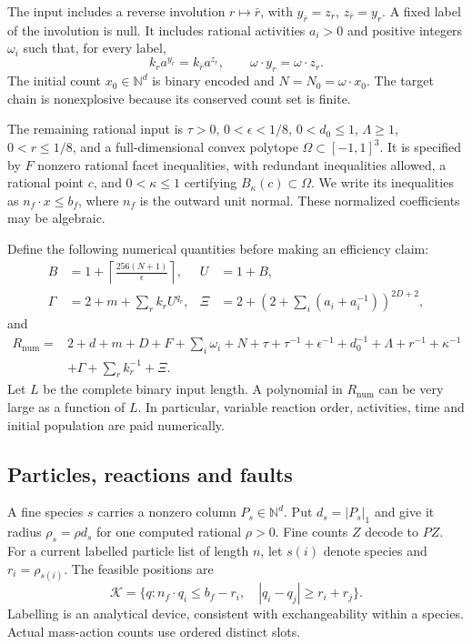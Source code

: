 \documentclass[11pt]{article}
\numberwithin{equation}{section}
\theoremstyle{definition}
\theoremstyle{remark}\newtheorem{remark}[theorem]{Remark}
\newcommand{\N}{\mathbb N}
\newcommand{\K}{\mathcal K}
\newcommand{\Rnum}{R_{\mathrm{num}}}
\begin{document}
The input includes a reverse involution $r\mapsto\bar r$, with
$y_{\bar r}=z_r$, $z_{\bar r}=y_r$. A fixed label of the involution is null.
It includes rational activities $a_i>0$ and positive integers $\omega_i$ such
that, for every label,
\begin{equation}\label{eq:targetbalance}
 k_ra^{y_r}=k_{\bar r}a^{z_r},\qquad
 \omega\cdot y_r=\omega\cdot z_r.
\end{equation}
The initial count $x_0\in\N^d$ is binary encoded and
$N=N_0=\omega\cdot x_0$. The target chain is nonexplosive because its
conserved count set is finite.

The remaining rational input is $\tau>0$, $0<\epsilon<1/8$,
$0<d_0\le1$, $\Lambda\ge1$, $0<r\le1/8$, and a full-dimensional convex
polytope $\Omega\subset[-1,1]^3$. It is specified by $F$ nonzero rational
facet inequalities, with redundant inequalities allowed, a rational point
$c$, and $0<\kappa\le1$ certifying $B_\kappa(c)\subset\Omega$.
We write its inequalities as $n_f\cdot x\le b_f$, where $n_f$ is the
outward unit normal. These normalized coefficients may be algebraic.

Define the following numerical quantities before making an efficiency claim:
\begin{align}
 B&=1+\left\lceil\frac{256(N+1)}\epsilon\right\rceil,
 &U&=1+B,\nonumber\\
 \Gamma&=2+m+\sum_rk_rU^{q_r},
 &\Xi&=2+\left(2+\sum_i(a_i+a_i^{-1})\right)^{2D+2},
 \label{eq:charges}\end{align}
and
\begin{align}
\Rnum={}&2+d+m+D+F+\sum_i\omega_i+N+\tau+\tau^{-1}
 +\epsilon^{-1}+d_0^{-1}+\Lambda+r^{-1}+\kappa^{-1}\nonumber\\
 &+\Gamma+\sum_rk_r^{-1}+\Xi.\label{eq:Rnum}
\end{align}
Let $L$ be the complete binary input length. A polynomial in $\Rnum$ can
be very large as a function of $L$. In particular, variable reaction order,
activities, time and initial population are paid numerically.

\subsection{Particles, reactions and faults}

A fine species $s$ carries a nonzero column $P_s\in\N^d$. Put
$d_s=|P_s|_1$ and give it radius $\rho_s=\rho d_s$ for one computed
rational $\rho>0$. Fine counts $Z$ decode to $PZ$. For a current labelled
particle list of length $n$, let $s(i)$ denote species and $r_i=\rho_{s(i)}$.
The feasible positions are
\begin{equation}\label{eq:configuration}
 \K=\{q:n_f\cdot q_i\le b_f-r_i,\quad
             |q_i-q_j|\ge r_i+r_j\}.
\end{equation}
Labelling is an analytical device, consistent with exchangeability within a
species. Actual mass-action counts use ordered distinct slots.
\end{document}
